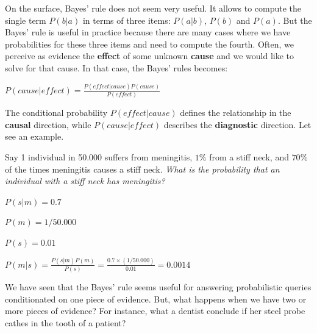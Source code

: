 On the surface, Bayes' rule does not seem very useful. It allows to compute the single term $P(b|a)$ in terms of three items: $P(a|b)$, $P(b)$ and $P(a)$. 
But the Bayes' rule is useful in practice because there are many cases where we have probabilities for these three items and need to compute the fourth.
Often, we perceive as evidence the \textbf{effect} of some unknown \textbf{cause} and we would like to solve for that cause. In that case, the Bayes' rules becomes:
\begin{center}
    $P(cause|effect) = \frac{P(effect|cause)P(cause)}{P(effect)}$ 
\end{center}
The conditional probability $P(effect|cause)$ defines the relationship in the \textbf{causal} direction, while $P(cause|effect)$ describes the \textbf{diagnostic} direction. Let see an example.
\begin{example}
    Say 1 individual in 50.000 suffers from meningitis, $1\%$ from a stiff neck, and $70\%$ of the times meningitis causes a stiff neck. \textit{What is the probability that an individual with a stiff neck has meningitis?} \vspace{3.5pt}

    $P(s|m) = 0.7$

    $P(m) = 1/50.000$

    $P(s) = 0.01$

    $P(m|s) = \frac{P(s|m)P(m)}{P(s)} = \frac{0.7\times(1/50.000)}{0.01} = 0.0014$
\end{example}
We have seen that the Bayes' rule seems useful for answering probabilistic queries conditionated on one piece of evidence. But, what happens when we have two or more pieces of evidence? For instance, what a dentist conclude if her steel probe cathes in the tooth of a patient?
